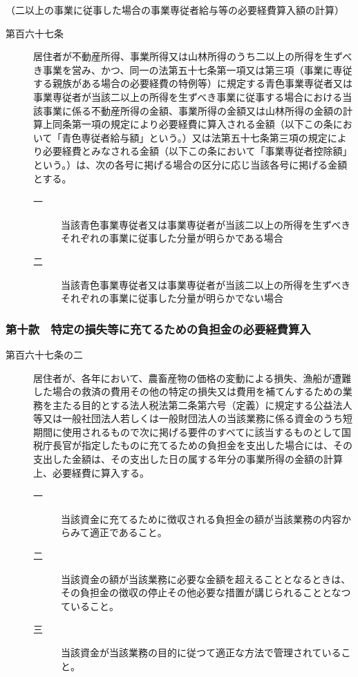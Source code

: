 \documentclass[twocolumn,a4j,10pt]{ltjtarticle}
\begin{document}
\noindent\hspace{10pt}（二以上の事業に従事した場合の事業専従者給与等の必要経費算入額の計算）
\begin{description}
\item[第百六十七条]居住者が不動産所得、事業所得又は山林所得のうち二以上の所得を生ずべき事業を営み、かつ、同一の法第五十七条第一項又は第三項（事業に専従する親族がある場合の必要経費の特例等）に規定する青色事業専従者又は事業専従者が当該二以上の所得を生ずべき事業に従事する場合における当該事業に係る不動産所得の金額、事業所得の金額又は山林所得の金額の計算上同条第一項の規定により必要経費に算入される金額（以下この条において「青色専従者給与額」という。）又は法第五十七条第三項の規定により必要経費とみなされる金額（以下この条において「事業専従者控除額」という。）は、次の各号に掲げる場合の区分に応じ当該各号に掲げる金額とする。
\begin{description}
\item[一]当該青色事業専従者又は事業専従者が当該二以上の所得を生ずべきそれぞれの事業に従事した分量が明らかである場合
\item[二]当該青色事業専従者又は事業専従者が当該二以上の所得を生ずべきそれぞれの事業に従事した分量が明らかでない場合
\end{description}
\end{description}
\subsubsection*{第十款　特定の損失等に充てるための負担金の必要経費算入}
\begin{description}
\item[第百六十七条の二]居住者が、各年において、農畜産物の価格の変動による損失、漁船が遭難した場合の救済の費用その他の特定の損失又は費用を補てんするための業務を主たる目的とする法人税法第二条第六号（定義）に規定する公益法人等又は一般社団法人若しくは一般財団法人の当該業務に係る資金のうち短期間に使用されるもので次に掲げる要件のすべてに該当するものとして国税庁長官が指定したものに充てるための負担金を支出した場合には、その支出した金額は、その支出した日の属する年分の事業所得の金額の計算上、必要経費に算入する。
\begin{description}
\item[一]当該資金に充てるために徴収される負担金の額が当該業務の内容からみて適正であること。
\item[二]当該資金の額が当該業務に必要な金額を超えることとなるときは、その負担金の徴収の停止その他必要な措置が講じられることとなつていること。
\item[三]当該資金が当該業務の目的に従つて適正な方法で管理されていること。
\end{description}
\end{description}
\end{document}
